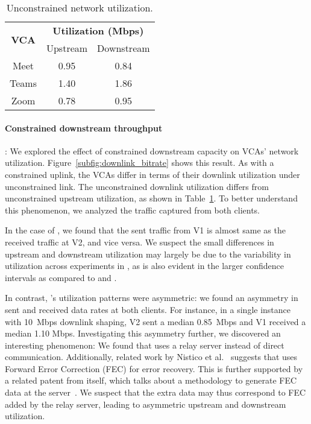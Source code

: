 \begin{table}[t]
\centering
\begin{tabular}{|c|c|c|}
\hline
\multirow{2}{*}{\textbf{VCA}} & 
    \multicolumn{2}{c|}{{\bf Utilization (Mbps)}} \\ 
    \cline{2-3} 
                              & Upstream                   & Downstream                  \\ \hline
Meet                          & 0.95                     & 0.84                      \\ 
Teams                         & 1.40                      & 1.86                      \\ 
Zoom                          & 0.78                     & 0.95                      \\ \hline
\end{tabular}
\caption{Unconstrained network utilization.}
\vspace{-1.5em}
\label{tab:vca_static}
\end{table}





\paragraph{Constrained downstream throughput}: We explored the effect of constrained
downstream capacity
on VCAs' network utilization. Figure~\ref{subfig:downlink_bitrate} shows this
result.
As with a constrained uplink, the VCAs differ in terms of their downlink
utilization under unconstrained link. The unconstrained downlink utilization
differs from unconstrained upstream utilization, as shown in
Table~\ref{tab:vca_static}. To better understand this phenomenon, we analyzed the traffic
captured from both clients. 

In the case of \teams, we found that the sent traffic from V1
is almost same as the received traffic at V2, and vice versa. 
We suspect the small
differences in upstream and downstream utilization may largely be due to the
variability in utilization across experiments in \teams, as is
also evident in the larger confidence intervals as compared to \zoom and \meet. 

In contrast, \zoom's utilization patterns were asymmetric: we found an
asymmetry in sent and received data rates at both clients. For instance, in a
single instance with 10~Mbps downlink shaping, V2 sent a median 0.85~Mbps and
V1 received a median 1.10 Mbps. Investigating this asymmetry further, we
discovered an interesting phenomenon: We found that \zoom uses a relay server
instead of direct communication. Additionally, related work by Nistico et
al.~\cite{nistico2020comparative} suggests that \zoom uses Forward Error
Correction (FEC) for error recovery. This is further supported by a related
patent from \zoom itself, which talks about a methodology to generate FEC data
at the server~\cite{liu2019error}. We suspect that the extra data may thus
correspond to FEC added by the relay server, leading to asymmetric upstream and
downstream utilization.  


